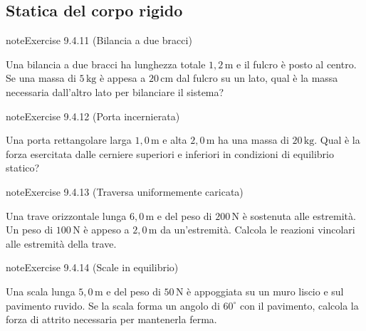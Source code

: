 \documentclass[letterpaper,10pt,italian]{jupyterBook}
\begin{document}
\subsection{Statica del corpo rigido}
\label{\detokenize{ch/mechanics/statics-problems:statica-del-corpo-rigido}} \label{exercise:ch/mechanics/statics-problems-exercise-10}

\begin{sphinxadmonition}{note}{Exercise 9.4.11 (Bilancia a due bracci)}



\sphinxAtStartPar
Una bilancia a due bracci ha lunghezza totale \(1,2 \, \text{m}\) e il fulcro è posto al centro. Se una massa di \(5 \, \text{kg}\) è appesa a \(20 \, \text{cm}\) dal fulcro su un lato, qual è la massa necessaria dall’altro lato per bilanciare il sistema?
\end{sphinxadmonition}
 \label{exercise:ch/mechanics/statics-problems-exercise-11}

\begin{sphinxadmonition}{note}{Exercise 9.4.12 (Porta incernierata)}



\sphinxAtStartPar
Una porta rettangolare larga \(1,0 \, \text{m}\) e alta \(2,0 \, \text{m}\) ha una massa di \(20 \, \text{kg}\). Qual è la forza esercitata dalle cerniere superiori e inferiori in condizioni di equilibrio statico?
\end{sphinxadmonition}
 \label{exercise:ch/mechanics/statics-problems-exercise-12}

\begin{sphinxadmonition}{note}{Exercise 9.4.13 (Traversa uniformemente caricata)}



\sphinxAtStartPar
Una trave orizzontale lunga \(6,0 \, \text{m}\) e del peso di \(200 \, \text{N}\) è sostenuta alle estremità. Un peso di \(100 \, \text{N}\) è appeso a \(2,0 \, \text{m}\) da un’estremità. Calcola le reazioni vincolari alle estremità della trave.
\end{sphinxadmonition}
 \label{exercise:ch/mechanics/statics-problems-exercise-13}

\begin{sphinxadmonition}{note}{Exercise 9.4.14 (Scale in equilibrio)}



\sphinxAtStartPar
Una scala lunga \(5,0 \, \text{m}\) e del peso di \(50 \, \text{N}\) è appoggiata su un muro liscio e sul pavimento ruvido. Se la scala forma un angolo di \(60^\circ\) con il pavimento, calcola la forza di attrito necessaria per mantenerla ferma.
\end{sphinxadmonition}
 \label{exercise:ch/mechanics/statics-problems-exercise-14}
\end{document}
